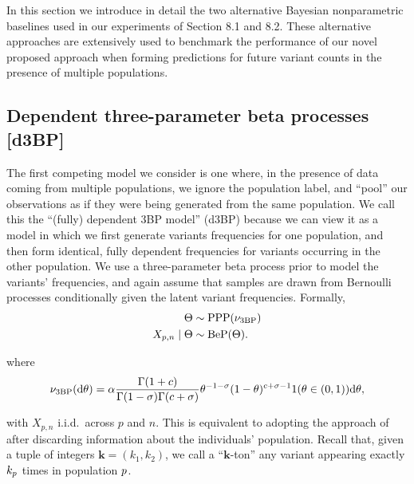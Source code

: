 
In this section we introduce in detail the two alternative Bayesian nonparametric baselines used in our experiments of Section 8.1 and 8.2.
These alternative approaches are extensively used to benchmark the performance of our novel proposed approach when forming predictions for future variant counts in the presence of multiple populations.

\subsection{Dependent three-parameter beta processes [d3BP]} \label{sec:d3BP}


The first competing model we consider is one where, in the presence of data coming from multiple populations, we ignore the population label, and ``pool'' our observations as if they were being generated from the same population. We call this the  ``(fully) dependent 3BP model'' (d3BP) because we can view it as a model in which we first generate variants frequencies for one population, and then form identical, fully dependent frequencies for variants occurring in the other population. We use a three-parameter beta process prior to model the variants' frequencies, and again assume that samples are drawn from Bernoulli processes conditionally given the latent variant frequencies. Formally, 
\begin{align}
\begin{split}
	\Theta &\sim \mathrm{PPP}(\nu_{\mathrm{3BP}}) \\
	X_{p,n} \mid\Theta &\sim \mathrm{BeP}(\Theta). 
\end{split} \label{eq:d3BP}
\end{align}

where 
\begin{align*}
    \nu_{\mathrm{3BP}}(\mathrm{d} \theta)=\alpha \frac{\Gamma(1+c)}{\Gamma(1-\sigma)\Gamma(c+\sigma)}\theta^{-1-\sigma}(1-\theta)^{c+\sigma-1}1(\theta\in (0,1))\mathrm{d}\theta,
\end{align*}

with $X_{p,n}$ i.i.d.\ across $p$ and $n$.
This is equivalent to adopting the approach of \citet{Masoero2021} after discarding information about the individuals' population. 
Recall that, given a tuple of integers $\bm{k} = (k_1, k_2)$, we call a ``$\bm{k}$-ton'' any variant appearing exactly $k_p$ times in population $p$.


